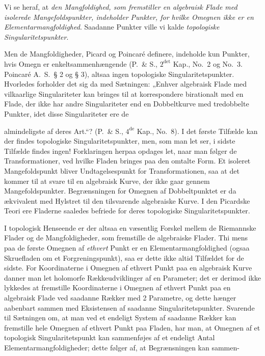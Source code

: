 \documentclass{article}
\begin{document}
Vi se heraf, at \emph{den Mangfoldighed, som fremstiller en algebraisk Flade med isolerede Mangefoldspunkter, indeholder Punkter, for hvilke Omegnen ikke er en Elementarmangfoldighed}. Saadanne Punkter ville vi kalde \emph{topologiske Singularitetspunkter}.

Men de Mangfoldigheder, Picard og Poincaré definere, indeholde kun Punkter, hvis Omegn er enkeltsammenhængende (P.\ \& S., $2^{\text{det}}$ Kap., No.\ 2 og No.\ 3. Poincaré A.\ S.\ § 2 og § 3), altsaa ingen topologiske Singularitetspunkter. Hvorledes forholder det sig da med Sætningen: „Enhver algebraisk Flade med vilkaarlige Singulariteter kan bringes til at korrespondere birationalt med en Flade, der ikke har andre Singulariteter end en Dobbeltkurve med tredobbelte Punkter, idet disse Singulariteter ere de

almindeligste af deres Art.“? (P.\ \& S., $4^{\text{de}}$ Kap., No.\ 8). I det første Tilfælde kan der findes topologiske Singularitetspunkter, men, som man let ser, i sidste Tilfælde findes ingen! Forklaringen herpaa opdages let, naar man følger de Transformationer, ved hvilke Fladen bringes paa den omtalte Form. Et isoleret Mangefoldspunkt bliver Undtagelsespunkt for Transformationen, saa at det kommer til at svare til en algebraisk Kurve, der ikke gaar gennem Mangefoldspunkter. Begrænsningen for Omegnen af Dobbeltpunktet er da ækvivalent med Hylstret til den tilsvarende algebraiske Kurve. I den Picardske Teori ere Fladerne saaledes befriede for deres topologiske Singularitetspunkter.

I topologisk Henseende er der altsaa en væsentlig Forskel mellem de Riemannske Flader og de Mangfoldigheder, som fremstille de algebraiske Flader. Thi mens paa de første Omegnen af \emph{ethvert} Punkt er en Elementarmangfoldighed (ogsaa Skruefladen om et Forgreningspunkt), saa er dette ikke altid Tilfældet for de sidste. For Koordinaterne i Omegnen af ethvert Punkt paa en algebraisk Kurve danner man let holomorfe Rækkeudviklinger af en Parameter; det er derimod ikke lykkedes at fremstille Koordinaterne i Omegnen af ethvert Punkt paa en algebraisk Flade ved saadanne Rækker med 2 Parametre, og dette hænger aabenbart sammen med Eksistensen af saadanne Singularitetspunkter. Svarende til Sætningen om, at man ved et endeligt System af saadanne Rækker kan fremstille hele Omegnen af ethvert Punkt paa Fladen, har man, at Omegnen af et topologisk Singularitetspunkt kan sammenføjes af et endeligt Antal Elementarmangfoldigheder; dette følger af, at Begrænsningen kan sammen-
\end{document}
